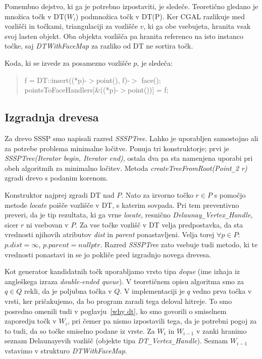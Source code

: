 \documentclass[a4paper, 12pt]{book}
\newcommand{\U}{\texttt{\_}}
\begin{document}
Pomembno dejstvo, ki ga je potrebno izpostaviti, je sledeče. Teoretično gledano je množica točk v DT($W_i$) podmnožica točk v DT(P). Ker CGAL razlikuje med vozlišči in točkami, triangulaciji za vozlišče $v$, ki ga obe vsebujeta, hranita vsak svoj lasten objekt. Oba objekta vozlišča pa hranita referenco na isto instanco točke, saj \textit{DTWithFaceMap} za razliko od DT ne sortira točk.


Koda, ki se izvede za posamezno vozlišče $p$, je sledeča:

\begin{quote}
f = DT::insert((*p)-$>$point(), f)-$>$ face();\\
pointsToFaceHandlers[\&((*p)-$>$point())] = f;
\end{quote}

\subsection{Izgradnja drevesa} 

Za drevo SSSP smo napisali razred \textit{SSSPTree}. Lahko je uporabljen samostojno ali za potrebe problema minimalne ločitve. Ponuja tri konstruktorje; prvi je \textit{SSSP\-Tree(Iterator begin, Iterator end)}, ostala dva pa sta namenjena uporabi pri obeh algoritmih za minimalno ločitev. Metoda \textit{createTreeFromRoot\-(Point\U 2 r)} zgradi drevo s podanim korenom. 

Konstruktor najprej zgradi DT nad $P$. Nato za izvorno točko $r\in P$ s pomočjo metode \textit{locate} poišče vozlišče v DT, s katerim sovpada. Pri tem preventivno preveri, da je tip rezultata, ki ga vrne \textit{locate}, resnično \textit{Delaunay\U Ver\-tex\U Handle}, sicer $r$ ni vsebovan v $P$. Za vse točke vozlišč v DT velja predpostavka, da sta vrednosti njihovih atributov \textit{dist} in \textit{parent} ponastavljeni. Velja torej $\forall p\in P:$ $p.dist = \infty$,  $p.parent = nullptr$. Razred \textit{SSSPTree} zato vsebuje tudi metodo, ki te vrednosti ponastavi in se jo pokliče pred izgradnjo novega drevesa.

Kot generator kandidatnih točk uporabljamo vrsto tipa \textit{deque} (ime izhaja iz angleškega izraza \textit{double-ended queue}). V teoretičnem opisu algoritma smo za $q\in Q$ rekli, da je poljubna točka v $Q$. V implementaciji je $q$ vedno prva točka v vrsti, ker pričakujemo, da bo program zaradi tega deloval hitreje. To smo posredno omenili tudi v poglavju~\ref{why dt}, ko smo govorili o smiselnem zaporedju točk v $W_i$, pri čemer pa nismo izpostavili tega, da je potrebni pogoj za to tudi, da so točke smiselno podane iz vrste. Za $W_i$ in $W_{i-1}$ v zanki hranimo seznam Delaunayevih vozlišč (objekte tipa \textit{DT\U Vertex\U Handle}). Seznam $W_{i-1}$ vstavimo v strukturo \textit{DTWithFaceMap}. 
\end{document}
